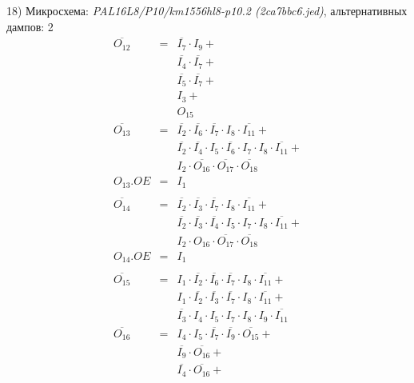 \documentclass[a4paper,russian]{report}
\begin{document}
18) Микросхема: \emph{PAL16L8/P10/km1556hl8-p10.2  (2ca7bbc6.jed)}, альтернативных дампов: 2
\nopagebreak\begin{eqnarray*}
    \overline{O_{12}} & = & \overline{I_{7}} \cdotp I_{9} + \\
	& &  \overline{I_{4}} \cdotp \overline{I_{7}} + \\
	& &  \overline{I_{5}} \cdotp \overline{I_{7}} + \\
	& &  I_{3} + \\
	& &  O_{15} \\
    \overline{O_{13}} & = & \overline{I_{2}} \cdotp \overline{I_{6}} \cdotp \overline{I_{7}} \cdotp I_{8} \cdotp \overline{I_{11}} + \\
	& &  \overline{I_{2}} \cdotp \overline{I_{4}} \cdotp I_{5} \cdotp \overline{I_{6}} \cdotp I_{7} \cdotp I_{8} \cdotp \overline{I_{11}} + \\
	& &  I_{2} \cdotp \overline{O_{16}} \cdotp \overline{O_{17}} \cdotp \overline{O_{18}} \\
    O_{13}.OE & = & I_{1} \\ \\
    \overline{O_{14}} & = & \overline{I_{2}} \cdotp \overline{I_{3}} \cdotp \overline{I_{7}} \cdotp I_{8} \cdotp \overline{I_{11}} + \\
	& &  \overline{I_{2}} \cdotp \overline{I_{3}} \cdotp \overline{I_{4}} \cdotp I_{5} \cdotp I_{7} \cdotp I_{8} \cdotp \overline{I_{11}} + \\
	& &  I_{2} \cdotp O_{16} \cdotp \overline{O_{17}} \cdotp \overline{O_{18}} \\
    O_{14}.OE & = & I_{1} \\ \\
    \overline{O_{15}} & = & I_{1} \cdotp \overline{I_{2}} \cdotp \overline{I_{6}} \cdotp \overline{I_{7}} \cdotp I_{8} \cdotp \overline{I_{11}} + \\
	& &  I_{1} \cdotp \overline{I_{2}} \cdotp \overline{I_{3}} \cdotp \overline{I_{7}} \cdotp I_{8} \cdotp \overline{I_{11}} + \\
	& &  \overline{I_{3}} \cdotp I_{4} \cdotp I_{5} \cdotp I_{7} \cdotp I_{8} \cdotp I_{9} \cdotp \overline{I_{11}} \\
    \overline{O_{16}} & = & I_{4} \cdotp I_{5} \cdotp \overline{I_{7}} \cdotp \overline{I_{9}} \cdotp \overline{O_{15}} + \\
	& &  \overline{I_{9}} \cdotp \overline{O_{16}} + \\
	& &  \overline{I_{4}} \cdotp \overline{O_{16}} + \\

\end{eqnarray*}
\end{document}
